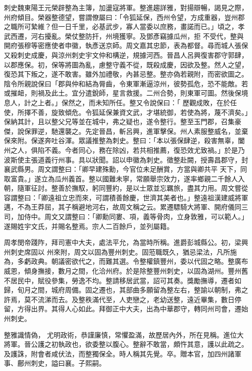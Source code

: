 \begin{pinyinscope}
 刺史魏東陽王元榮辟整為主簿，加盪寇將軍。整進趨詳雅，對揚辯暢，謁見之際，州府傾目。榮器整德望，嘗謂僚屬曰：「令狐延保，西州令望，方成重器，豈州郡之職所可縶維？但一日千里，必基武步，寡人當委以庶務，畫諾而已。」頃之，孝武西遷，河右擾亂。榮仗整防扞，州境獲寧。及鄧彥竊據瓜州，拒
 不受代，整與開府張穆等密應使者申徽，執彥送京師。周文嘉其忠節，表為都督。尋而城人張保又殺刺史成慶，與涼州刺史宇文仲和構逆，規據河西。晉昌人呂興復害郡守郭肆，以郡應保。初，保等將圖為亂，慮整守義不從，既殺成慶，因欲及整。然人之望，復恐其下叛之，遂不敢害。雖外加禮敬，內甚忌整。整亦偽若親附，而密欲圖之。陰令所親說保曰「郡與仲和結為脣齒，令東軍漸逼涼州，彼勢孤危，恐不能敵。若或摧衄，則禍及此土。宜分遣銳師，星言救援。二州合勢，則東軍可圖。然後保境息人，計之上者。」保然之，而未知所任。整又令說保曰：「
 歷觀成敗，在於任使，所擇不善，旋致傾危。令狐延保兼資文武，才堪統御，若使為將，蔑不濟矣。」保納其計，且以整父兄等並在城中，弗之疑也，遂令整行。整至玉門郡，召集豪傑，說保罪逆，馳還襲之。先定晉昌，斬呂興，進軍擊保。州人素服整威名，並棄保來附。保遂奔吐谷渾。眾議推整為刺史。整曰：「本以張保肆逆，殺害無辜，闔州之人，俱陷不義。今者同心，務在除凶，若共相推薦，復恐效尤致禍。」於是乃波斯使主張道義行州事。具以狀聞。詔以申徽為刺史。徵整赴闕，授壽昌郡守，封襄武縣男。周文謂整曰：「卿早建殊勳，今官位未足酬賞，方當與卿共平
 天下，同取富貴。」遂立為瓜州義首。整以國難未寧，常願舉宗效力，遂率鄉親二千餘人入朝，隨軍征討。整善於撫馭，躬同豐約，是以士眾並忘羈旅，盡其力用。周文嘗從容謂整曰：「卿遠祖立忠而來，可謂積善餘慶，世濟其美者也。」整遠祖漢建威將軍邁，不為王莽屈，其子稱避地河右，故周文稱之云。累遷驃騎大將軍、開府儀同三司，加侍中。周文又謂整曰：「卿勳同婁、項，義等骨肉，立身敦雅，可以範人。」遂賜姓宇文氏，并賜名整焉。宗人二百餘戶，並列屬籍。



 周孝閔帝踐阼，拜司憲中大夫，處法平允，為當時所稱。進爵彭城縣公。初，梁興州刺史席固以
 州來附，周文以固為豐州刺史。固蒞職既久，猶忌梁法，凡所施為，多虧政典。朝議密欲代之，而難其選。令整權鎮豐州，委以代固之略。整廣布威恩，傾身撫接，數月之間，化洽州府。於是除整豐州刺史，以固為湖州。豐州舊不居民中，賦役參集，勞逸不均。整請移居武當，詔可其奏。獎勵撫導，遷者如歸，旬月之間，城府周備。固之遷也，其部曲多願留為整左右，整諭以朝制，弗之許焉，莫不流涕而去。及整秩滿代至，人吏戀之，老幼送整，遠近畢集，數日停留，方得出界。其得人心如此。拜御正中大夫，出為中華郡守，轉同州司會，遷始州刺史。



 整雅識情偽，
 尤明政術，恭謹廉慎，常懼盈滿，故歷居內外，所在見稱。進位大將軍。晉公護之初執政也，欲委整以腹心。整辭不敢當，頗忤其意，護以此疏之。及護誅，附會者咸伏法，而整獨保全。時人稱其先覺。卒。贈本官，加四州諸軍事、鄜州刺史，謚曰襄。子熙嗣。




\end{pinyinscope}
